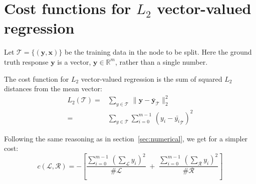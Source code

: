 \documentclass[10pt,openany]{article}
\numberwithin{definition}{section}
\numberwithin{example}{section}
\numberwithin{equation}{section}
\numberwithin{figure}{section}
\begin{document}
\section{Cost functions for $L_2$ vector-valued regression}

Let $\mathcal{T} = \{ \left( \mathbf{y}, \mathbf{x} \right) \}$
be the training data in the node to be split.
Here the ground truth response $\mathbf{y}$ is a vector, 
$\mathbf{y}\in\mathbb{R}^m$, rather than a single number.

The cost function for $L_2$ vector-valued regression is the sum of
squared $L_2$ distances from the mean vector: 
\begin{align*}
L_{2}\left(\mathcal{T}\right) 
= &
\sum_{y\in\mathcal{T}}\,
\|\mathbf{y}-\bar{\mathbf{y}}_{\mathcal{T}}\|_{2}^{2}\\
= &
\sum_{y\in\mathcal{T}}\sum_{i=0}^{m-1}\,
\left(y_i-\bar{y_i}_{\mathcal{T}}\right)^{2}
\end{align*}

Following the same reasoning as in section~\ref{sec:numerical}, 
we get for a simpler cost:
$$
c\left(\mathcal{L},\mathcal{R}\right) = 
-\left[
\frac{
\sum_{i=0}^{m-1} \, \left(\sum_{\mathcal{L}}y_i\right)^{2}}
{\#\mathcal{L}}
\; + \;
\frac{\sum_{i=0}^{m-1} \,
\left(\sum_{\mathcal{R}}y_i\right)^{2}}{\#\mathcal{R}}\right] 
$$

\newpage{}


\end{document}
